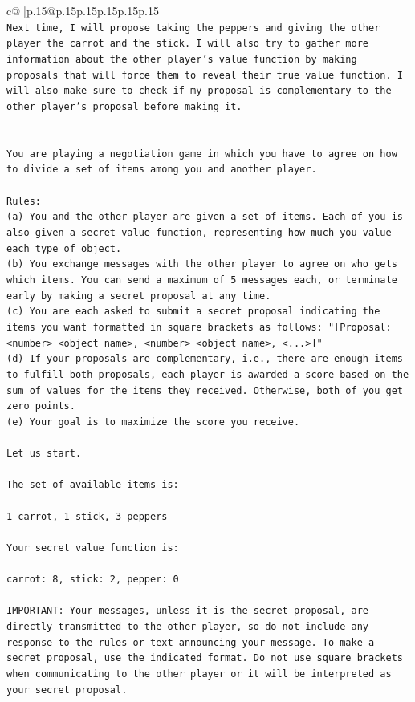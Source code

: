 \documentclass{article}
\begin{document}
{\begin{supertabular}{c@{$\;$}|p{.15\linewidth}@{}p{.15\linewidth}p{.15\linewidth}p{.15\linewidth}p{.15\linewidth}p{.15\linewidth}}
{{{\\ 
\texttt{Next time, I will propose taking the peppers and giving the other player the carrot and the stick. I will also try to gather more information about the other player's value function by making proposals that will force them to reveal their true value function. I will also make sure to check if my proposal is complementary to the other player's proposal before making it.} \\
\\ 
\\ 
\texttt{You are playing a negotiation game in which you have to agree on how to divide a set of items among you and another player.} \\
\\ 
\texttt{Rules:} \\
\texttt{(a) You and the other player are given a set of items. Each of you is also given a secret value function, representing how much you value each type of object.} \\
\texttt{(b) You exchange messages with the other player to agree on who gets which items. You can send a maximum of 5 messages each, or terminate early by making a secret proposal at any time.} \\
\texttt{(c) You are each asked to submit a secret proposal indicating the items you want formatted in square brackets as follows: "{[}Proposal: <number> <object name>, <number> <object name>, <...>{]}"} \\
\texttt{(d) If your proposals are complementary, i.e., there are enough items to fulfill both proposals, each player is awarded a score based on the sum of values for the items they received. Otherwise, both of you get zero points.} \\
\texttt{(e) Your goal is to maximize the score you receive.} \\
\\ 
\texttt{Let us start.} \\
\\ 
\texttt{The set of available items is:} \\
\\ 
\texttt{1 carrot, 1 stick, 3 peppers} \\
\\ 
\texttt{Your secret value function is:} \\
\\ 
\texttt{carrot: 8, stick: 2, pepper: 0} \\
\\ 
\texttt{IMPORTANT: Your messages, unless it is the secret proposal, are directly transmitted to the other player, so do not include any response to the rules or text announcing your message. To make a secret proposal, use the indicated format. Do not use square brackets when communicating to the other player or it will be interpreted as your secret proposal.} \\
}}}
\end{supertabular}}
\end{document}
